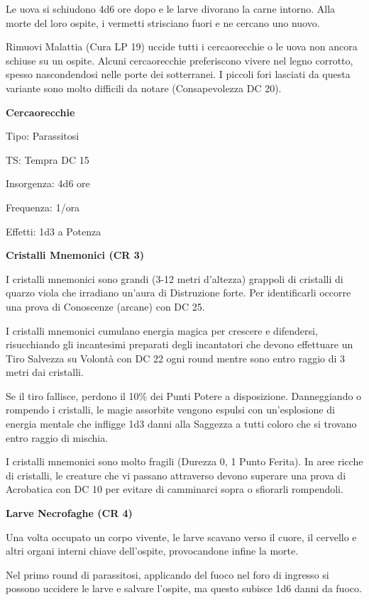 \documentclass[a4paper,11pt,twoside,openany]{book}
\begin{document}
Le uova si schiudono 4d6 ore dopo e le larve divorano la carne intorno. Alla morte del loro ospite, i vermetti strisciano fuori e ne cercano uno nuovo.

Rimuovi Malattia (Cura LP 19) uccide tutti i cercaorecchie o le uova non ancora schiuse su un ospite. Alcuni cercaorecchie preferiscono vivere nel legno corrotto, spesso nascondendosi nelle porte dei sotterranei. I piccoli fori lasciati da questa variante sono molto difficili da notare (Consapevolezza DC 20).

\textbf{Cercaorecchie}

Tipo: Parassitosi

TS: Tempra DC 15

Insorgenza: 4d6 ore

Frequenza: 1/ora

Effetti: 1d3 a Potenza

\textbf{Cristalli Mnemonici (CR 3)}

I cristalli mnemonici sono grandi (3-12 metri d'altezza) grappoli di cristalli di quarzo viola che irradiano un'aura di Distruzione forte. Per identificarli occorre una prova di Conoscenze (arcane) con DC 25.

I cristalli mnemonici cumulano energia magica per crescere e difendersi, risucchiando gli incantesimi preparati degli incantatori che devono effettuare un Tiro Salvezza su Volontà con DC 22 ogni round mentre sono entro raggio di 3 metri dai cristalli.

Se il tiro fallisce, perdono il 10\% dei Punti Potere a disposizione. Danneggiando o rompendo i cristalli, le magie assorbite vengono espulsi con un'esplosione di energia mentale che infligge 1d3 danni alla Saggezza a tutti coloro che si trovano entro raggio di mischia.

I cristalli mnemonici sono molto fragili (Durezza 0, 1 Punto Ferita).
In aree ricche di cristalli, le creature che vi passano attraverso devono superare una prova di Acrobatica con DC 10 per evitare di camminarci sopra o sfiorarli rompendoli.

\textbf{Larve Necrofaghe (CR 4)}

Una volta occupato un corpo vivente, le larve scavano verso il cuore, il cervello e altri organi interni chiave dell'ospite, provocandone infine la morte.

Nel primo round di parassitosi, applicando del fuoco nel foro di ingresso si possono uccidere le larve e salvare l'ospite, ma questo subisce 1d6 danni da fuoco.
\end{document}
